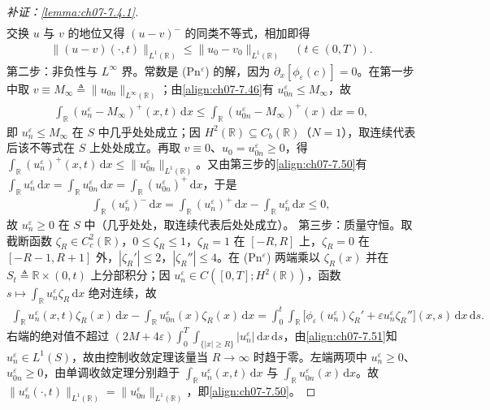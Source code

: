 ﻿\documentclass[../../main.tex]{subfiles}%
\begin{document}
\begin{proof}[补证：\cref{lemma:ch07-7.4.1}]
\begin{align*}
\end{align*}
交换 $u$ 与 $v$ 的地位又得 $(u-v)^-$ 的同类不等式，相加即得
\begin{align*}
\|(u-v)(\cdot,t)\|_{L^1(\mathbb{R})}\leqslant\|u_0-v_0\|_{L^1(\mathbb{R})}\quad(t\in(0,T)).
\end{align*}
第二步：非负性与 $L^\infty$ 界。常数是 (Pn$^\varepsilon$) 的解，因为 $\partial_x[\phi_\varepsilon(c)]=0$。在第一步中取 $v\equiv M_\infty\triangleq\|u_{0n}\|_{L^\infty(\mathbb{R})}$；由\eqref{align:ch07-7.46}有 $u_{0n}^\varepsilon\leqslant M_\infty$，故
\begin{align*}
\int_{\mathbb{R}}(u_n^\varepsilon-M_\infty)^+(x,t)\,\mathrm{d}x\leqslant\int_{\mathbb{R}}(u_{0n}^\varepsilon-M_\infty)^+(x)\,\mathrm{d}x=0,
\end{align*}
即 $u_n^\varepsilon\leqslant M_\infty$ 在 $S$ 中几乎处处成立；因 $H^2(\mathbb{R})\subseteq C_b(\mathbb{R})$（$N=1$），取连续代表后该不等式在 $S$ 上处处成立。再取 $v\equiv0$、$u_0=u_{0n}^\varepsilon\geqslant0$，得 $\int_{\mathbb{R}}(u_n^\varepsilon)^+(x,t)\,\mathrm{d}x\leqslant\|u_{0n}^\varepsilon\|_{L^1(\mathbb{R})}$。又由第三步的\eqref{align:ch07-7.50}有 $\int_{\mathbb{R}}u_n^\varepsilon\,\mathrm{d}x=\int_{\mathbb{R}}u_{0n}^\varepsilon\,\mathrm{d}x=\int_{\mathbb{R}}(u_{0n}^\varepsilon)^+\,\mathrm{d}x$，于是
\begin{align*}
\int_{\mathbb{R}}(u_n^\varepsilon)^-\,\mathrm{d}x=\int_{\mathbb{R}}(u_n^\varepsilon)^+\,\mathrm{d}x-\int_{\mathbb{R}}u_n^\varepsilon\,\mathrm{d}x\leqslant0,
\end{align*}
故 $u_n^\varepsilon\geqslant0$ 在 $S$ 中（几乎处处，取连续代表后处处成立）。
第三步：质量守恒。取截断函数 $\zeta_R\in C^2_c(\mathbb{R})$，$0\leqslant\zeta_R\leqslant1$，$\zeta_R=1$ 在 $[-R,R]$ 上，$\zeta_R=0$ 在 $[-R-1,R+1]$ 外，$|\zeta_R'|\leqslant2$，$|\zeta_R''|\leqslant4$。在 (Pn$^\varepsilon$) 两端乘以 $\zeta_R(x)$ 并在 $S_t\triangleq\mathbb{R}\times(0,t)$ 上分部积分；因 $u_n^\varepsilon\in C([0,T];H^2(\mathbb{R}))$，函数 $s\mapsto\int_{\mathbb{R}}u_n^\varepsilon\zeta_R\,\mathrm{d}x$ 绝对连续，故
\begin{align*}
\int_{\mathbb{R}}u_n^\varepsilon(x,t)\zeta_R(x)\,\mathrm{d}x-\int_{\mathbb{R}}u_{0n}^\varepsilon(x)\zeta_R(x)\,\mathrm{d}x
=\int_0^t\int_{\mathbb{R}}\big[\phi_\varepsilon(u_n^\varepsilon)\zeta_R'+\varepsilon u_n^\varepsilon\zeta_R''\big](x,s)\,\mathrm{d}x\,\mathrm{d}s.
\end{align*}
右端的绝对值不超过 $(2M+4\varepsilon)\int_0^T\int_{\{|x|\geqslant R\}}|u_n^\varepsilon|\,\mathrm{d}x\,\mathrm{d}s$，由\eqref{align:ch07-7.51}知 $u_n^\varepsilon\in L^1(S)$，故由控制收敛定理该量当 $R\to\infty$ 时趋于零。左端两项中 $u_n^\varepsilon\geqslant0$、$u_{0n}^\varepsilon\geqslant0$，由单调收敛定理分别趋于 $\int_{\mathbb{R}}u_n^\varepsilon(x,t)\,\mathrm{d}x$ 与 $\int_{\mathbb{R}}u_{0n}^\varepsilon(x)\,\mathrm{d}x$。故 $\|u_n^\varepsilon(\cdot,t)\|_{L^1(\mathbb{R})}=\|u_{0n}^\varepsilon\|_{L^1(\mathbb{R})}$，即\eqref{align:ch07-7.50}。

\end{proof}
\end{document}
